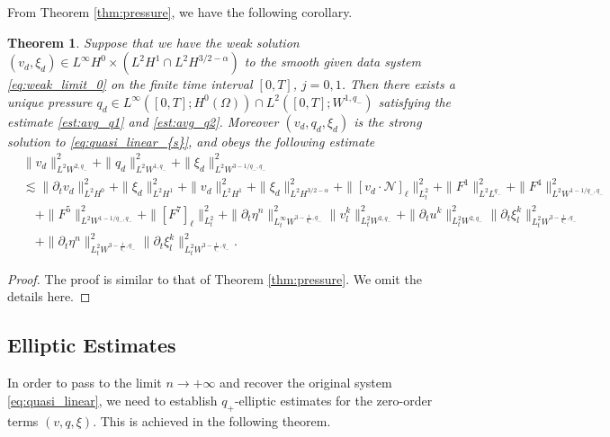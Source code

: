 \documentclass[letterpaper,reqno,10pt,twoside]{amsart}
\newtheorem{theorem}{Theorem}[section]
\theoremstyle{definition}
\theoremstyle{remark}
\def\p{\partial}
\def\Om{\Omega}
\begin{document}
	From Theorem \ref{thm:pressure}, we have the following corollary.
	\begin{theorem}{\label{thm:pressure_s}}
		Suppose that we have the weak solution $( v_{d},  \xi_{d}) \in L^\infty H^0 \times \left( L^2 H^1 \cap L^2H^{3/2-\alpha} \right)$ to the smooth given data system \eqref{eq:weak_limit_0} on the finite time interval $[0, T]$, $j=0, 1$. Then there exists a unique pressure $q_{d} \in L^\infty ([0, T]; H^0(\Om)) \cap L^2 ([0, T]; W^{1, q_-})$ satisfying the estimate \eqref{est:avg_q1} and \eqref{est:avg_q2}. Moreover $(v_{d},q_{d},\xi_{d})$ is the strong solution to \eqref{eq:quasi_linear_{s}}, and obeys the following estimate 
		\begin{equation}\label{est:diss_100}
			\begin{aligned}
				&\| v_{d}\|_{L^2W^{2,q_-}}^2 + \|q_{d}\|_{L^2W^{1,q_-}}^2 + \|\xi_{d}\|_{L^2W^{3-1/q_-,q_-}}^2 \\
				&\lesssim  \|\p_tv_{d}\|_{L^2H^0}^2 +\|\xi_{d} \|_{L^2H^1}^2 + \|v_{d}\|_{L^2H^1}^2 + \|\xi_{d}\|_{L^2H^{3/2-\alpha}}^2 + \|[v_{d}\cdot \mathcal{N}]_\ell\|_{L^2_t}^2+ \|F^1\|_{L^2L^{q_-}}^2 + \|F^4\|_{L^2W^{1-1/q_-,q_-}}^2 \\
				&\quad + \|F^5\|_{L^2W^{1-1/q_-,q_-}}^2 + \|[F^7]_\ell\|_{L_t^{2}}^2+\|\p_{t}\eta^{n}\|^{2}_{L_{t}^{\infty}W^{3-\frac{1}{q_{-}},q_{-}}}\|v_{l}^{k}\|_{L_{t}^{2}W^{2,q_{-}}}^{2}+\|\p_{t}u^{k}\|_{L_{t}^{2}W^{2,q_{-}}}^{2}\|\p_{t}\xi_{l}^{k}\|_{L_{t}^{2}W^{3-\frac{1}{q_{-}},q_{-}}}^{2}\\
				&\quad+\|\p_{t}\eta^{n}\|_{L_{t}^{2}W^{3-\frac{1}{q_{-}},q_{-}}}^{2}\|\p_{t}\xi_{l}^{k}\|_{L_{t}^{2}W^{3-\frac{1}{q_{-}},q_{-}}}^{2}.
			\end{aligned}
		\end{equation}
	\end{theorem}
	\begin{proof}
		The proof is similar to that of Theorem \ref{thm:pressure}. We omit the details here.
	\end{proof}
	
	
	\subsection{Elliptic Estimates}
	
	
	In order to pass to the limit $n \to +\infty$ and recover the original system \eqref{eq:quasi_linear}, we need to establish $q_{+}$-elliptic estimates for the zero-order terms $(v,q,\xi)$. This is achieved in the following theorem.
	
\end{document}
